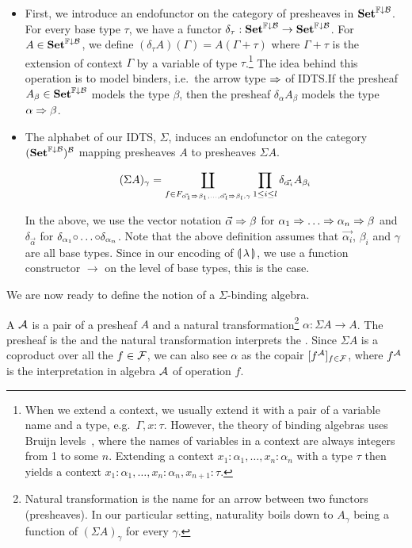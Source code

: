 \begin{itemize}
\item First, we introduce an endofunctor on the category of presheaves in
  $\mathbf{Set}^{\mathbb{F}\downarrow\mathcal{B}}$. For every base type $\tau$, we have a functor
  $\delta_\tau : \mathbf{Set}^{\mathbb{F}\downarrow\mathcal{B}} \to \mathbf{Set}^{\mathbb{F}\downarrow\mathcal{B}}$. For
  $A \in \mathbf{Set}^{\mathbb{F}\downarrow\mathcal{B}}$, we define
  $(\delta_\tau A)(\Gamma) = A(\Gamma + \tau)$ where $\Gamma + \tau$ is the
  extension of context $\Gamma$ by a variable of type $\tau$.\footnote{When
    we extend a context, we usually extend it with a pair of a variable
    name and a type, e.g.\ $\Gamma, x : \tau$. However, the theory of
    binding algebras uses Bruijn levels~\cite{de1972lambda}, where the
    names of variables in a context are always integers from 1 to some
    $n$. Extending a context $x_1 : \alpha_1, \ldots, x_n : \alpha_n$ with
    a type $\tau$ then yields a context
    $x_1 : \alpha_1, \ldots, x_n : \alpha_n, x_{n+1} : \tau$.} The idea
  behind this operation is to model binders, i.e.\ the arrow type $\Rightarrow$ of
  IDTS.\@ If the presheaf $A_\beta \in \mathbf{Set}^{\mathbb{F}\downarrow\mathcal{B}}$ models the type
  $\beta$, then the presheaf $\delta_\alpha A_\beta$ models the type
  $\alpha \Rightarrow \beta$.

\item The alphabet of our IDTS, $\Sigma$, induces an endofunctor on the
  category $(\mathbf{Set}^{\mathbb{F}\downarrow\mathcal{B}})^{\mathcal{B}}$ mapping presheaves $A$ to presheaves
  $\Sigma A$.

  $$
  (\Sigma A)_\gamma = \coprod_{f \in F_{\vec{\alpha_1} \Rightarrow \beta_1, \ldots, \vec{\alpha_l} \Rightarrow \beta_l, \gamma}} \prod_{1 \le i \le l} \delta_{\vec{\alpha_i}} A_{\beta_i}
  $$

  In the above, we use the vector notation $\vec{\alpha} \Rightarrow \beta$ for
  $\alpha_1 \Rightarrow \ldots \Rightarrow \alpha_n \Rightarrow \beta$ and $\delta_{\vec{\alpha}}$
  for $\delta_{\alpha_1} {\mathbin{\circ}} \ldots {\mathbin{\circ}} \delta_{\alpha_n}$. Note that
  the above definition assumes that $\vec{\alpha_i}$, $\beta_i$ and
  $\gamma$ are all base types. Since in our encoding of $\llparenthesis \, \lambda \, \rrparenthesis$,
  we use a function constructor $\to$ on the level of base types, this is
  the case.
\end{itemize}

We are now ready to define the notion of a $\Sigma$-binding algebra.

\begin{definition}
  A  $\mathcal{A}$ is a pair of a presheaf $A$
  and a natural transformation\footnote{Natural transformation is the name
    for an arrow between two functors (presheaves). In our particular
    setting, naturality boils down to $A_\gamma$ being a function of
    $(\Sigma A)_\gamma$ for every $\gamma$.} $\alpha : \Sigma A \to A$. The
  presheaf is the  and the natural transformation interprets
  the . Since $\Sigma A$ is a coproduct over all the
  $f \in \mathcal{F}$, we can also see $\alpha$ as the copair
  $[f^{\mathcal{A}}]_{f \in \mathcal{F}}$, where $f^{\mathcal{A}}$ is the interpretation in algebra
  $\mathcal{A}$ of operation $f$.
\end{definition}

